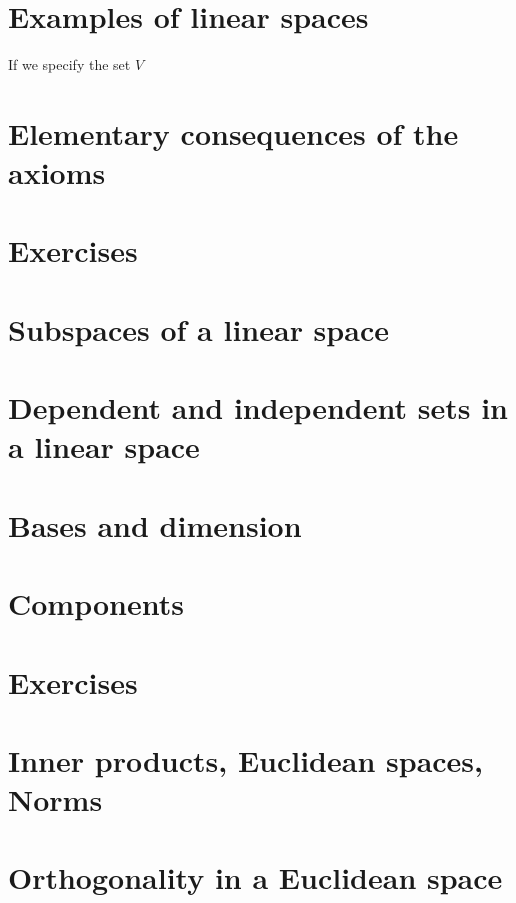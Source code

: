 \documentclass[cn,11pt,chinese]{elegantbook}
\numberwithin{equation}{section}
\begin{document}
\section{Examples of linear spaces}
If we specify the set $V$





\section{Elementary consequences of the axioms}



\section{Exercises}



\section{Subspaces of a linear space}



\section{Dependent and independent sets in a linear space}


\section{Bases and dimension}



\section{Components}



\section{Exercises}



\section{Inner products, Euclidean spaces, Norms}



\section{Orthogonality in a Euclidean space}
\end{document}
